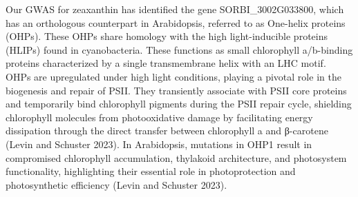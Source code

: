 \documentclass[10pt,letterpaper]{article}
\begin{document}
\begin{itemize}
Our GWAS for zeaxanthin has identified the gene SORBI\_3002G033800, which has an orthologous counterpart in Arabidopsis, referred to as One-helix proteins (OHPs). These OHPs share homology with the high light-inducible proteins (HLIPs) found in cyanobacteria. These functions as small chlorophyll a/b-binding proteins characterized by a single transmembrane helix with an LHC motif. OHPs are upregulated under high light conditions, playing a pivotal role in the biogenesis and repair of PSII. They transiently associate with PSII core proteins and temporarily bind chlorophyll pigments during the PSII repair cycle, shielding chlorophyll molecules from photooxidative damage by facilitating energy dissipation through the direct transfer between chlorophyll a and β-carotene (Levin and Schuster 2023). In Arabidopsis, mutations in OHP1 result in compromised chlorophyll accumulation, thylakoid architecture, and photosystem functionality, highlighting their essential role in photoprotection and photosynthetic efficiency (Levin and Schuster 2023).




\end{itemize}
\end{document}

